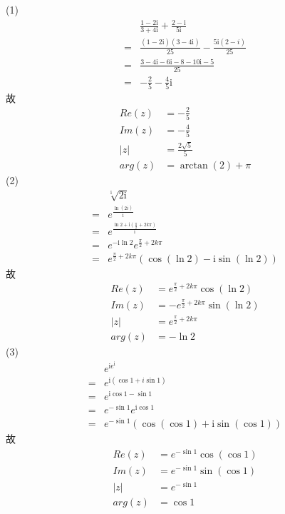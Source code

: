 \documentclass{phyasgn}
\renewcommand{\i}{\mathrm{i}}
\begin{document}
\begin{sol}[1]
    (1)$$\begin{aligned}
        &\frac{1-2\i}{3+4\i}+\frac{2-\i}{5\i}\\
        =&\frac{(1-2\i)(3-4\i)}{25}-\frac{5\i(2-i)}{25}\\
        =&\frac{3-4\i-6\i-8-10\i-5}{25}\\
        =&-\frac{2}{5}-\frac{4}{5}\i
    \end{aligned}$$
    故$$\begin{aligned}
        Re(z)&=-\frac{2}{5}\\
        Im(z)&=-\frac{4}{5}\\
        |z|&=\frac{2\sqrt{5}}{5}\\
        arg(z)&=\arctan(2)+\pi
    \end{aligned}$$
    (2)$$\begin{aligned}
        &\sqrt[\i]{2\i}\\
        =&e^{\frac{\ln (2i)}{\i}}\\
        =&e^{\frac{\ln 2+\i(\frac{\pi}{2}+2k\pi)}{\i}}\\
        =&e^{-\i\ln 2}e^{\frac{\pi}{2}+2k\pi}\\
        =&e^{\frac{\pi}{2}+2k\pi}(\cos(\ln 2)-\i\sin(\ln2))
    \end{aligned}$$
    故$$\begin{aligned}
        Re(z)&=e^{\frac{\pi}{2}+2k\pi}\cos(\ln 2)\\
        Im(z)&=-e^{\frac{\pi}{2}+2k\pi}\sin(\ln2)\\
        |z|&=e^{\frac{\pi}{2}+2k\pi}\\
        arg(z)&=-\ln 2
    \end{aligned}$$
    (3)$$\begin{aligned}
        &e^{\i e^{\i}}\\
        =&e^{\i (\cos1+i\sin1)}\\
        =&e^{\i \cos1-\sin1}\\
        =&e^{-\sin1}e^{\i \cos1}\\
        =&e^{-\sin1}(\cos(\cos1)+\i\sin(\cos1))
    \end{aligned}$$
    故$$\begin{aligned}
        Re(z)&=e^{-\sin1}\cos(\cos1)\\
        Im(z)&=e^{-\sin1}\sin(\cos1)\\
        |z|&=e^{-\sin1}\\
        arg(z)&=\cos1
    \end{aligned}$$
\end{sol}\par
\end{document}
